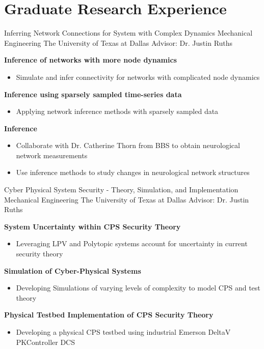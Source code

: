 \section{Graduate Research Experience}

{Inferring Network Connections for System with Complex Dynamics}
{Mechanical Engineering}
{The University of Texas at Dallas}
{Advisor: Dr. Justin Ruths}
{
    \textbf{Inference of networks with more node dynamics}
    \begin{itemize}
        \item Simulate and infer connectivity for networks with complicated node dynamics
    \end{itemize}
    \textbf{Inference using sparsely sampled time-series data}
    \begin{itemize}
        \item Applying network inference methods with sparsely sampled data
    \end{itemize}
    \textbf{Inference }
    \begin{itemize}
        \item Collaborate with Dr. Catherine Thorn from BBS to obtain neurological network measurements
        \item Use inference methods to study changes in neurological network structures
    \end{itemize}
}

{Cyber Physical System Security - Theory, Simulation, and Implementation}
{Mechanical Engineering}
{The University of Texas at Dallas}
{Advisor: Dr. Justin Ruths}
{
    \textbf{System Uncertainty within CPS Security Theory}
    \begin{itemize}
        \item Leveraging LPV and Polytopic systems account for uncertainty in current security theory
    \end{itemize}
    \textbf{Simulation of Cyber-Physical Systems}
    \begin{itemize}
        \item Developing Simulations of varying levels of complexity to model CPS and test theory
    \end{itemize}
    \textbf{Physical Testbed Implementation of CPS Security Theory}
    \begin{itemize}
        \item Developing a physical CPS testbed using industrial Emerson DeltaV PKController DCS
    \end{itemize}
}
